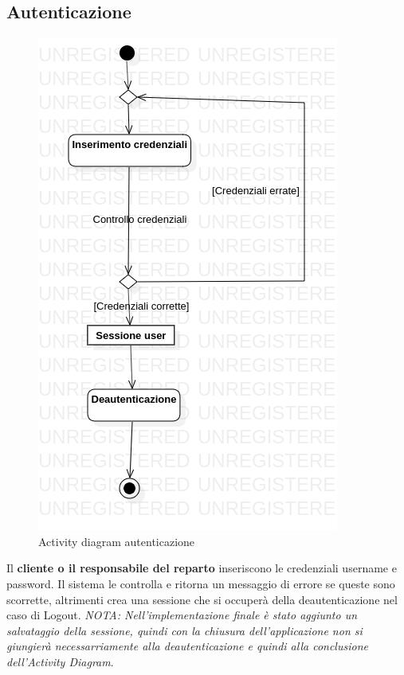 \documentclass[12pt, a4paper]{article}
\numberwithin{equation}{section} %
\begin{document}
\subsection{Autenticazione}
\begin{figure}[h]
\centering
\includegraphics{Use Case Model!Autenticazione!ActivityAutenticazione!ActivityDiagramAutenticazione_8.png}
\caption{Activity diagram autenticazione}
\end{figure}

Il \textbf{cliente o il responsabile del reparto} inseriscono le credenziali username e password.
Il sistema le controlla e ritorna un messaggio di errore se queste sono scorrette, altrimenti crea una sessione che si occuperà della deautenticazione nel caso di Logout.\break
\emph{NOTA: Nell'implementazione finale è stato aggiunto un salvataggio della sessione, quindi con la chiusura dell'applicazione non si giungierà necessarriamente alla deautenticazione e quindi alla conclusione dell'Activity Diagram}.
\end{document}
